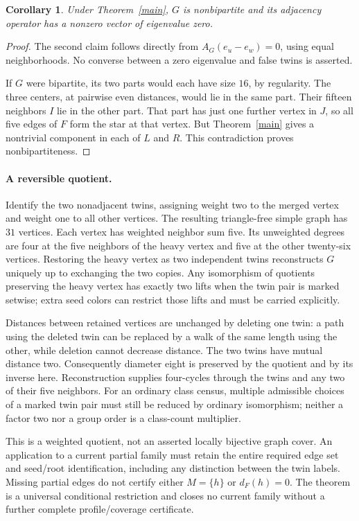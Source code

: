 \documentclass[11pt]{article}
\newtheorem{corollary}[theorem]{Corollary}
\begin{document}
\begin{corollary}
Under Theorem~\ref{main}, $G$ is nonbipartite and its adjacency operator
has a nonzero vector of eigenvalue zero.
\end{corollary}
\begin{proof}
The second claim follows directly from $A_G(e_u-e_w)=0$, using equal
neighborhoods. No converse between a zero eigenvalue and false twins
is asserted.

If $G$ were bipartite, its two parts would each have size $16$, by
regularity. The three centers, at pairwise even distances, would lie
in the same part. Their fifteen neighbors $I$ lie in the other part.
That part has just one further vertex in $J$, so all five edges of
$F$ form the star at that vertex. But Theorem~\ref{main} gives a
nontrivial component in each of $L$ and $R$. This contradiction proves
nonbipartiteness.
\end{proof}

\paragraph{A reversible quotient.}
Identify the two nonadjacent twins, assigning weight two to the merged
vertex and weight one to all other vertices. The resulting triangle-free
simple graph has $31$ vertices. Each vertex has weighted neighbor sum
five. Its unweighted degrees are four at the five neighbors of the heavy
vertex and five at the other twenty-six vertices. Restoring the heavy
vertex as two independent twins reconstructs $G$ uniquely up to exchanging
the two copies. Any isomorphism of quotients preserving the heavy vertex
has exactly two lifts when the twin pair is marked setwise; extra seed
colors can restrict those lifts and must be carried explicitly.

Distances between retained vertices are unchanged by deleting one twin:
a path using the deleted twin can be replaced by a walk of the same length
using the other, while deletion cannot decrease distance. The two twins
have mutual distance two. Consequently diameter eight is preserved by
the quotient and by its inverse here. Reconstruction supplies four-cycles
through the twins and any two of their five neighbors. For an ordinary
class census, multiple admissible choices of a marked twin pair must still
be reduced by ordinary isomorphism; neither a factor two nor a group order
is a class-count multiplier.

This is a weighted quotient, not an asserted locally bijective graph cover.
An application to a current partial family must retain the entire required
edge set and seed/root identification, including any distinction between
the twin labels. Missing partial edges do not certify either $M=\{h\}$
or $d_F(h)=0$. The theorem is a universal conditional restriction and closes
no current family without a further complete profile/coverage certificate.
\end{document}
